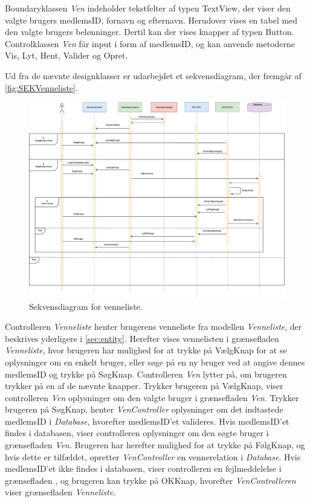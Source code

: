 \noindent
Boundaryklassen \textit{Ven} indeholder tekstfelter af typen TextView, der viser den valgte brugers medlemsID, fornavn og efternavn. Herudover vises en tabel med den valgte brugers belønninger. Dertil kan der vises knapper af typen Button. Controlklassen \textit{Ven} får input i form af medlemsID, og kan anvende metoderne Vis, Lyt, Hent, Valider og Opret.

Ud fra de nævnte designklasser er udarbejdet et sekvensdiagram, der fremgår af \autoref{fig:SEKVenneliste}.

\begin{figure} [H]
\centering
\includegraphics[width=1\textwidth]{figures/Sek/SEKVenneliste}
\caption{Sekvensdiagram for venneliste.}
\label{fig:SEKVenneliste}
\end{figure}

\noindent
Controlleren \textit{Venneliste} henter brugerens venneliste fra modellen \textit{Venneliste}, der beskrives yderligere i \autoref{sec:entity}. Herefter vises vennelisten i grænsefladen \textit{Venneliste}, hvor brugeren har mulighed for at trykke på VælgKnap for at se oplysninger om en enkelt bruger, eller søge på en ny bruger ved at angive dennes medlemsID og trykke på SøgKnap. Controlleren \textit{Ven} lytter på, om brugeren trykker på en af de nævnte knapper.
Trykker brugeren på VælgKnap, viser controlleren \textit{Ven} oplysninger om den valgte bruger i grænsefladen \textit{Ven}.
Trykker brugeren på SøgKnap, henter \textit{VenController} oplysninger om det indtastede medlemsID i \textit{Database}, hvorefter medlemsID'et valideres. Hvis medlemsID'et findes i databasen, viser controlleren oplysninger om den søgte bruger i grænsefladen \textit{Ven}. Brugeren har herefter mulighed for at trykke på FølgKnap, og hvis dette er tilfældet, opretter \textit{VenController} en vennerelation i \textit{Database}. Hvis medlemsID'et ikke findes i databasen, viser controlleren en fejlmeddelelse i grænsefladen , og brugeren kan trykke på OKKnap, hvorefter \textit{VenControlleren} viser grænsefladen \textit{Venneliste}. 

